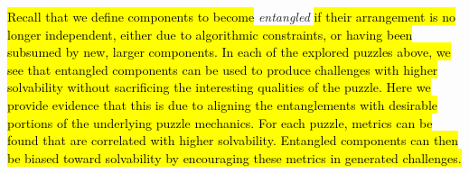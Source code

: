 \documentclass[journal]{IEEEtran}
\begin{document}



\noindent
\hl{Recall that we define components to become} {\it entangled} \hl{if their arrangement is no longer independent, either due to algorithmic constraints, or having been subsumed by new, larger components. In each of the explored puzzles above, we see that entangled components can be used to produce challenges with higher solvability without sacrificing the interesting qualities of the puzzle. Here we provide evidence that this is due to aligning the entanglements with desirable portions of the underlying puzzle mechanics. For each puzzle, metrics can be found that are correlated with higher solvability. Entangled components can then be biased toward solvability by encouraging these metrics in generated challenges.}
\end{document}
